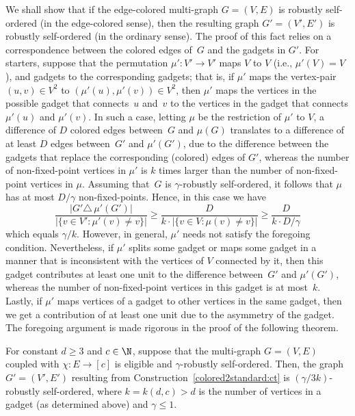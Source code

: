 We shall show that if the edge-colored multi-graph $G=(V,E)$
is robustly self-ordered (in the edge-colored sense),
then the resulting graph $G'=(V',E')$ is robustly self-ordered
(in the ordinary sense). The proof of this fact relies on
a correspondence between the colored edges of~$G$ and the gadgets in $G'$.
For starters, suppose that the permutation $\mu':V'\to V'$
%
maps $V$ to $V$ (i.e., $\mu'(V)=V$),
and gadgets to the corresponding gadgets; that is,
if $\mu'$ maps the vertex-pair $(u,v)\in V^2$
to $(\mu'(u),\mu'(v))\in V^2$,
then $\mu'$ maps the vertices in the possible gadget that
connects~$u$ and~$v$ to the vertices in the gadget that
connects $\mu'(u)$ and $\mu'(v)$.
%
%
%
%
In such a case, letting $\mu$ be the restriction of $\mu'$ to $V$,
a difference of $D$ colored edges between~$G$ and $\mu(G)$
translates to a difference of
at least $D$ edges between~$G'$ and $\mu'(G')$,
due to the difference between the gadgets
that replace the corresponding (colored) edges of $G'$,
%
%
%
%
whereas the number of non-fixed-point vertices in $\mu'$ is $k$ times
larger than the number of non-fixed-point vertices in $\mu$.
%
Assuming that~$G$ is $\gamma$-robustly self-ordered,
it follows that $\mu$ has at most $D/\gamma$ non-fixed-points.
Hence, in this case we have
 \begin{equation*}
\frac{|G'\triangle\,\mu'(G')|}{|\{v\in V':\mu'(v)\!\neq\!v\}|}
%
  \geq \frac{D}{k\cdot|\{v\in V:\mu(v)\!\neq\!v\}|}
   \geq \frac{D}{k\cdot D/\gamma}
 \end{equation*}
which equals $\gamma/k$.
%
%
However, in general, $\mu'$ needs not satisfy the foregoing condition.
Nevertheless, if $\mu'$ splits some gadget
or maps some gadget in a manner that is inconsistent with
the vertices of $V$ connected by it,
then this gadget contributes at least one unit
to the difference between~$G'$ and $\mu'(G')$,
whereas the number of non-fixed-point vertices in this gadget
is at most~$k$.
Lastly, if $\mu'$ maps vertices of a gadget to other
vertices in the same gadget, then we get a contribution
of at least one unit due to the asymmetry of the gadget.
The foregoing argument is made rigorous in the proof of the following theorem.

\label{colored2std:clm}
For constant $d\geq3$ and $c\in\N$,
suppose that the multi-graph $G=(V,E)$ coupled with $\chi\!:\!E\!\to\![c]$
is eligible and $\gamma$-robustly self-ordered.
%
%
%
%
%
%
%
%
%
%
%
Then, the graph $G'=(V',E')$ resulting from
Construction~\ref{colored2standard:ct}
is $(\gamma/3k)$-robustly self-ordered,
%
where $k=k(d,c)>d$ is the number of vertices in a gadget
{\rm(as determined above)} and $\gamma\leq1$.
%
%
\ET
%
%
%
%

